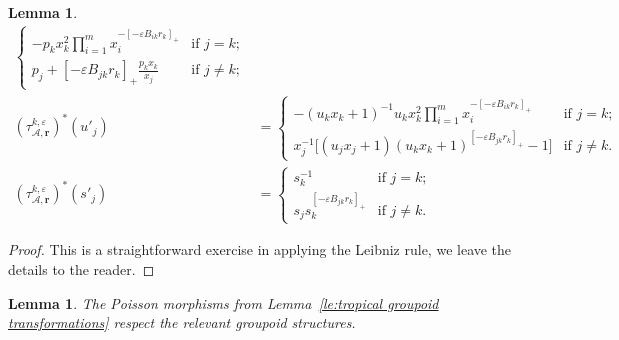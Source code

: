 \documentclass{amsart}
\newtheorem{lemma}[theorem]{Lemma}
\numberwithin{equation}{section}
\newcommand{\bfr}{{\boldsymbol{r}}}
\newcommand{\cA}{\mathcal{A}}
\begin{document}
\begin{lemma}
\begin{align}
    \begin{cases} 
      -p_k x_k^2 \prod\limits_{i=1}^m x_i^{-[-\varepsilon B_{ik} r_k]_+} & \text{if $j=k$;}\\ 
      p_j + [-\varepsilon B_{jk} r_k]_+ \frac{p_k x_k}{x_j} & \text{if $j\ne k$;}
    \end{cases}\\
    \label{eq:tropical BA transformation}
    (\tau_{\cA,\bfr}^{k,\varepsilon})^*(u'_j)
    &=\begin{cases} 
      -(u_k x_k + 1)^{-1}u_k x_k^2 \prod\limits_{i=1}^m x_i^{-[-\varepsilon B_{ik} r_k]_+}  & \text{if $j=k$;}\\ 
      x_j^{-1}\big[(u_j x_j + 1) (u_k x_k + 1)^{[-\varepsilon B_{jk} r_k]_+}-1\big] & \text{if $j\ne k$.}
    \end{cases}\\
    \label{eq:tropical DA transformation}
    (\tau_{\cA,\bfr}^{k,\varepsilon})^*(s'_j)
    &=\begin{cases} 
      s_k^{-1} & \text{if $j=k$;}\\ 
      s_j s_k^{[-\varepsilon B_{jk} r_k]_+} & \text{if $j\ne k$.}
    \end{cases}
  \end{align}
\end{lemma}
\begin{proof}
  This is a straightforward exercise in applying the Leibniz rule, we leave the details to the reader.
\end{proof}

\begin{lemma}
  The Poisson morphisms from Lemma~\ref{le:tropical groupoid transformations} respect the relevant groupoid structures.
\end{lemma}
\end{document}
